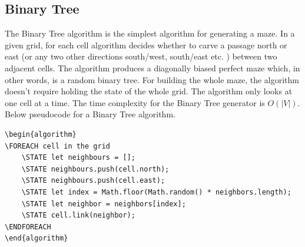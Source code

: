 \subsection{Binary Tree}
The Binary Tree algorithm is the simplest algorithm for generating a maze. In a given grid, for each cell algorithm decides whether to carve a passage north or east (or any two other directions south/west, south/east etc. ) between two adjacent cells. The algorithm produces a diagonally biased perfect maze which, in other words, is a random binary tree. For building the whole maze, the algorithm doesn’t require holding the state of the whole grid. The algorithm only looks at one cell at a time. The time complexity for the Binary Tree generator is $O(|V|)$. Below pseudocode for a Binary Tree algorithm.
\newline
\begin{lstlisting}[caption={Pseudocode for a Binary Tree Algorithm}]
\begin{algorithm}
\FOREACH cell in the grid
	\STATE let neighbours = [];
	\STATE neighbours.push(cell.north);
	\STATE neighbours.push(cell.east);
	\STATE let index = Math.floor(Math.random() * neighbors.length);
	\STATE let neighbor = neighbors[index];
	\STATE cell.link(neighbor);
\ENDFOREACH	
\end{algorithm}
\end{lstlisting}
\\
\newline
